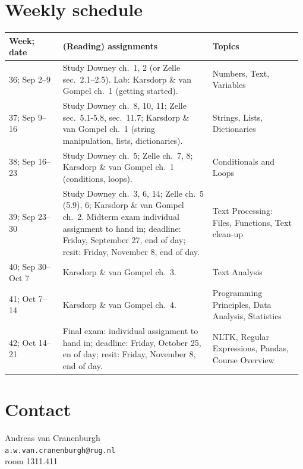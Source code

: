\documentclass[a4paper,12pt]{article}
\begin{document}
\section{Weekly schedule}\label{sectimetable}
{\raggedright
\begin{longtable}{p{0.18\linewidth} p{0.5\linewidth} p{0.3\linewidth} }
Week; date          & (Reading) assignments & Topics \\ \midrule

36; Sep 2--9 &
    Study Downey ch.\ 1, 2 (or Zelle sec.\ 2.1--2.5).
    Lab: Karsdorp \& van Gompel ch.\ 1 (getting started).
    & Numbers, Text, Variables
    \\

37; Sep 9--16     &
    Study Downey ch.\ 8, 10, 11;
    Zelle sec.\ 5.1-5.8, sec.\ 11.7;
    Karsdorp \& van Gompel ch.\ 1
    (string manipulation, lists,
    dictionaries).
    & Strings, Lists, Dictionaries
    \\

38; Sep 16--23    &
    Study Downey ch.\ 5;
    Zelle ch.\ 7, 8;
    Karsdorp \& van Gompel ch.\ 1 (conditions, loops).
    & Conditionals and Loops
    \\

39; Sep 23--30    &
    Study Downey ch.\ 3, 6, 14;
    Zelle ch.\ 5 (5.9), 6;
    Karsdorp \& van Gompel ch.\ 2.
    Midterm exam individual assignment to hand in;
    deadline: Friday, September 27, end
    of day; resit: Friday, November 8, end
    of day.
    & Text Processing: Files, Functions, Text clean-up
    \\

40; Sep 30--Oct 7 &
    Karsdorp \& van Gompel ch.\ 3.
    & Text Analysis
    \\

41; Oct 7--14     &
    Karsdorp \& van Gompel ch.\ 4.
    & Programming Principles, Data Analysis, Statistics
    \\

42; Oct 14--21    &
    Final exam: individual
    assignment to hand in; deadline:
    Friday, October 25, en of day; resit:
    Friday, November 8, end of day.
    & NLTK, Regular Expressions, Pandas, Course Overview
    \\

\end{longtable}
}

\section{Contact}

Andreas van Cranenburgh\\
\texttt{a.w.van.cranenburgh@rug.nl} \\
room 1311.411
\end{document}
